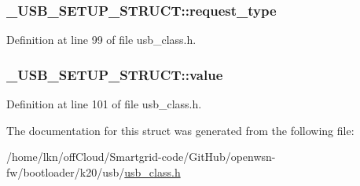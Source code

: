 \subsubsection[{\texorpdfstring{request\+\_\+type}{request_type}}]{ \+\_\+\+U\+S\+B\+\_\+\+S\+E\+T\+U\+P\+\_\+\+S\+T\+R\+U\+C\+T\+::request\+\_\+type}\hypertarget{struct___u_s_b___s_e_t_u_p___s_t_r_u_c_t_ac722258b4f1e0f0aba02687975e8520b}{}\label{struct___u_s_b___s_e_t_u_p___s_t_r_u_c_t_ac722258b4f1e0f0aba02687975e8520b}


Definition at line 99 of file usb\+\_\+class.\+h.

\subsubsection[{\texorpdfstring{value}{value}}]{ \+\_\+\+U\+S\+B\+\_\+\+S\+E\+T\+U\+P\+\_\+\+S\+T\+R\+U\+C\+T\+::value}\hypertarget{struct___u_s_b___s_e_t_u_p___s_t_r_u_c_t_a528ad369a038957703eb904e7dcd18d3}{}\label{struct___u_s_b___s_e_t_u_p___s_t_r_u_c_t_a528ad369a038957703eb904e7dcd18d3}


Definition at line 101 of file usb\+\_\+class.\+h.



The documentation for this struct was generated from the following file\+:\begin{DoxyCompactItemize}
\item 
/home/lkn/off\+Cloud/\+Smartgrid-\/code/\+Git\+Hub/openwsn-\/fw/bootloader/k20/usb/\hyperlink{usb__class_8h}{usb\+\_\+class.\+h}\end{DoxyCompactItemize}
